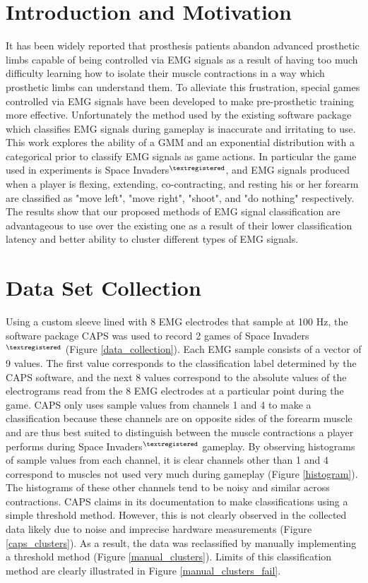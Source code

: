 \documentclass[times, 10pt,twocolumn]{article}
\begin{document}
\section{Introduction and Motivation}
It has been widely reported that prosthesis patients abandon advanced prosthetic limbs capable of being controlled via EMG signals as a result of having too much difficulty learning how to isolate their muscle contractions in a way which prosthetic limbs can understand them. To alleviate this frustration, special games controlled via EMG signals have been developed to make pre-prosthetic training more effective. Unfortunately the method used by the existing software package which classifies EMG signals during gameplay is inaccurate and irritating to use. This work explores the ability of a GMM and an exponential distribution with a categorical prior to classify EMG signals as game actions. In particular the game used in experiments is Space Invaders$^{\tiny{\textregistered}}$, and EMG signals produced when a player is flexing, extending, co-contracting, and resting his or her forearm are classified as "move left", "move right", "shoot", and "do nothing" respectively. The results show that our proposed methods of EMG signal classification are advantageous to use over the existing one as a result of their lower classification latency and better ability to cluster different types of EMG signals.

\section{Data Set Collection}
Using a custom sleeve lined with 8 EMG electrodes that sample at 100 Hz, the software package CAPS was used to record 2 games of Space Invaders$^{\tiny{\textregistered}}$ (Figure \ref{data_collection}). Each EMG sample consists of a vector of 9 values. The first value corresponds to the classification label determined by the CAPS software, and the next 8 values correspond to the absolute values of the electrograms read from the 8 EMG electrodes at a particular point during the game. CAPS only uses sample values from channels 1 and 4 to make a classification because these channels are on opposite sides of the forearm muscle and are thus best suited to distinguish between the muscle contractions a player performs during Space Invaders$^{\tiny{\textregistered}}$ gameplay. By observing histograms of sample values from each channel, it is clear channels other than 1 and 4 correspond to muscles not used very much during gameplay (Figure \ref{histogram}). The histograms of these other channels tend to be noisy and similar across contractions. CAPS claims in its documentation to make classifications using a simple threshold method. However, this is not clearly observed in the collected data likely due to noise and imprecise hardware measurements (Figure \ref{caps_clusters}). As a result, the data was reclassified by manually implementing a threshold method (Figure \ref{manual_clusters}). Limits of this classification method are clearly illustrated in Figure \ref{manual_clusters_fail}.
\end{document}
